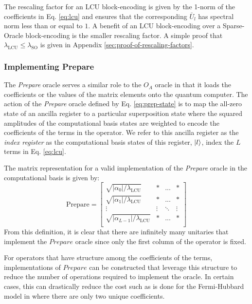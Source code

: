 The rescaling factor for an LCU block-encoding is given by the 1-norm of the coefficients in Eq. \ref{eq:lcu} and ensures that the corresponding $\bar{U}_l$ has spectral norm less than or equal to $1$.
A benefit of an LCU block-encoding over a Sparse-Oracle block-encoding is the smaller rescaling factor.
A simple proof that $\lambda_\text{LCU} \leq \lambda_\text{SO}$ is given in Appendix \ref{sec:proof-of-rescaling-factors}.

\subsubsection{Implementing \textbf{Prepare}}

The \textit{Prepare} oracle serves a similar role to the $O_A$ oracle in that it loads the coefficients or the values of the matrix elements onto the quantum computer.
The action of the \textit{Prepare} oracle defined by Eq. \ref{eq:prep-state} is to map the all-zero state of an ancilla register to a particular superposition state where the squared amplitudes of the computational basis states are weighted to encode the coefficients of the terms in the operator.
We refer to this ancilla register as the \textit{index register} as the computational basis states of this register, $\ket{l}$, index the $L$ terms in Eq. \ref{eq:lcu}.

The matrix representation for a valid implementation of the \textit{Prepare} oracle in the computational basis is given by:
\begin{equation}
    \text{Prepare} = \begin{bmatrix}
        \sqrt{|\alpha_0| / \lambda_\text{LCU}} & * & ... & * \\
        \sqrt{|\alpha_1| / \lambda_\text{LCU}} & * & ... & * \\
        \vdots & \vdots & \ddots & \vdots \\
        \sqrt{|\alpha_{L-1} |/ \lambda_\text{LCU}} & * & ... & * \\
    \end{bmatrix}
\end{equation}
From this definition, it is clear that there are infinitely many unitaries that implement the $\textit{Prepare}$ oracle since only the first column of the operator is fixed.

For operators that have structure among the coefficients of the terms, implementations of $\textit{Prepare}$ can be constructed that leverage this structure to reduce the number of operations required to implement the oracle.
In certain cases, this can drastically reduce the cost such as is done for the Fermi-Hubbard model in \cite{babbush2018encoding} where there are only two unique coefficients.

